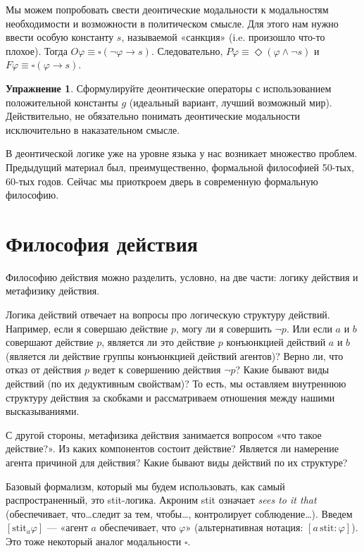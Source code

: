 \documentclass[openany]{book}
\theoremstyle{plain}
\theoremstyle{definition}
\newtheorem{xrc}{Упражнение}[]
\begin{document}
Мы можем попробовать свести деонтические модальности к модальностям необходимости и возможности в политическом смысле. Для этого нам нужно ввести особую константу \(s\), называемой «санкция» (i.e. произошло что-то плохое). Тогда \(O \varphi \equiv \square (\neg \varphi \to s)\). Следовательно, \(P \varphi \equiv \Diamond (\varphi \land \neg s)\) и \(F \varphi \equiv \square (\varphi \to s)\).

\begin{xrc}
    Сформулируйте деонтические операторы с использованием положительной константы \(g\) (идеальный вариант, лучший возможный мир). Действительно, не обязательно понимать деонтические модальности исключительно в наказательном смысле.
\end{xrc}

В деонтической логике уже на уровне языка у нас возникает множество проблем.
Предыдущий материал был, преимущественно, формальной философией 50-тых, 60-тых годов. Сейчас мы приоткроем дверь в современную формальную философию.

\section{Философия действия}

Философию действия можно разделить, условно, на две части: логику действия и метафизику действия.

Логика действий отвечает на вопросы про логическую структуру действий. Например, если я совершаю действие \(p\), могу ли я совершить \(\neg p\). Или если \(a\) и \(b\) совершают действие \(p\), является ли это действие \(p\) конъюнкцией действий \(a\) и \(b\) (является ли действие группы конъюнкцией действий агентов)? Верно ли, что отказ от действия \(p\) ведет к совершению действия \(\neg p\)? Какие бывают виды действий (по их дедуктивным свойствам)? То есть, мы оставляем внутреннюю структуру действия за скобками и рассматриваем отношения между нашими высказываниями.

С другой стороны, метафизика действия занимается вопросом «что такое действие?». Из каких компонентов состоит действие? Является ли намерение агента причиной для действия? Какие бывают виды действий по их структуре?

Базовый формализм, который мы будем использовать, как самый распространенный, это stit-логика. Акроним stit означает \textit{sees to it that} (обеспечивает, что\dots следит за тем, чтобы\dots, контролирует соблюдение\dots). Введем \([\mathrm{stit}_{a}\varphi]\) --- «агент \(a\) обеспечивает, что \(\varphi\)» (альтернативная нотация: \([a \,\mathrm{stit}: \varphi]\)). Это тоже некоторый аналог модальности \(\square\).
\end{document}
